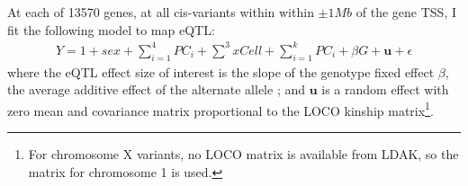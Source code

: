 At each of 13570 genes, at all cis-variants within within $\pm \num{1}{Mb}$ of the gene \gls{TSS}, I fit the following model to map \gls{eQTL}:
\begin{equation}
\begin{split}
Y = 1 + sex + \sum_{i=1}^{4}{PC_i} + \sum_{}^{3}{xCell} + \sum_{i=1}^{k}{PC_i} + \beta G + \mathbf{u} + \epsilon
\end{split}
\label{eq:hird_reQTL_limix_model}
\end{equation}
where the \gls{eQTL} effect size of interest is the slope of the genotype fixed effect $\beta$, the average additive effect of the alternate allele \autocite{visscher2019Fisher1918Paper};
and $\mathbf{u}$ is a random effect with zero mean and covariance matrix proportional to the \gls{LOCO} kinship matrix\footnote{For chromosome X variants, no \gls{LOCO} matrix is available from LDAK, so the matrix for chromosome 1 is used.}.

